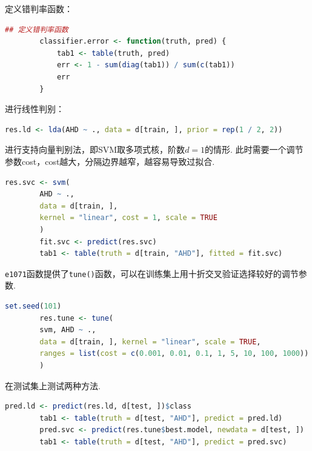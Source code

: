 \documentclass[12pt, a4paper, oneside]{ctexart}
\begin{document}
	定义错判率函数：
	\begin{lstlisting}[language=R]
		## 定义错判率函数
		classifier.error <- function(truth, pred) {
			tab1 <- table(truth, pred)
			err <- 1 - sum(diag(tab1)) / sum(c(tab1))
			err
		}
	\end{lstlisting}
	
	进行线性判别：
	\begin{lstlisting}[language=R]
		res.ld <- lda(AHD ~ ., data = d[train, ], prior = rep(1 / 2, 2))
	\end{lstlisting}
	
	进行支持向量判别法，即SVM取多项式核，阶数$d=1$的情形. 此时需要一个调节参数cost，cost越大，分隔边界越窄，越容易导致过拟合.
	\begin{lstlisting}[language=R]
		res.svc <- svm(
		AHD ~ .,
		data = d[train, ],
		kernel = "linear", cost = 1, scale = TRUE
		)
		fit.svc <- predict(res.svc)
		tab1 <- table(truth = d[train, "AHD"], fitted = fit.svc)
	\end{lstlisting}
	
	\texttt{e1071}函数提供了\texttt{tune()}函数，可以在训练集上用十折交叉验证选择较好的调节参数.
	\begin{lstlisting}[language=R]
		set.seed(101)
		res.tune <- tune(
		svm, AHD ~ .,
		data = d[train, ], kernel = "linear", scale = TRUE,
		ranges = list(cost = c(0.001, 0.01, 0.1, 1, 5, 10, 100, 1000))
		)
	\end{lstlisting}
	
	在测试集上测试两种方法.
	\begin{lstlisting}[language=R]
		pred.ld <- predict(res.ld, d[test, ])$class
		tab1 <- table(truth = d[test, "AHD"], predict = pred.ld)
		pred.svc <- predict(res.tune$best.model, newdata = d[test, ])
		tab1 <- table(truth = d[test, "AHD"], predict = pred.svc)
	\end{lstlisting}
	
\end{document}
